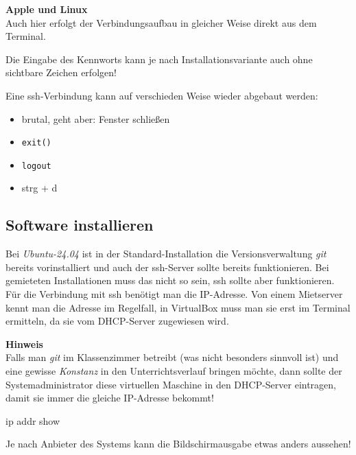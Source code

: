\documentclass[
  letterpaper,
  DIV=11]{scrreprt}
\newenvironment{Shaded}{\begin{snugshade}}{\end{snugshade}}
\newcommand{\ExtensionTok}[1]{\textcolor[rgb]{0.00,0.23,0.31}{#1}}
\newcommand{\NormalTok}[1]{\textcolor[rgb]{0.00,0.23,0.31}{#1}}
\newcommand{\git}{\textit{git}\xspace}
\newcommand{\strg}[1]{strg + #1\xspace}
\begin{document}
\textbf{Apple und Linux}\\
Auch hier erfolgt der Verbindungsaufbau in gleicher Weise direkt aus dem
Terminal.

Die Eingabe des Kennworts kann je nach Installationsvariante auch ohne
sichtbare Zeichen erfolgen!

Eine ssh-Verbindung kann auf verschieden Weise wieder abgebaut werden:

\begin{itemize}
\item
  brutal, geht aber: Fenster schließen
\item
  \texttt{exit()}
\item
  \texttt{logout}
\item
  \strg{d}
\end{itemize}

\subsection{Software installieren}\label{software-installieren}

Bei \emph{Ubuntu-24.04} ist in der Standard-Installation die
Versionsverwaltung \git bereits vorinstalliert und auch der ssh-Server
sollte bereits funktionieren. Bei gemieteten Installationen muss das
nicht so sein, ssh sollte aber funktionieren. Für die Verbindung mit ssh
benötigt man die IP-Adresse. Von einem Mietserver kennt man die Adresse
im Regelfall, in VirtualBox muss man sie erst im Terminal ermitteln, da
sie vom DHCP-Server zugewiesen wird.

\samplestart

\textbf{Hinweis}\\
Falls man \git im Klassenzimmer betreibt (was nicht besonders sinnvoll
ist) und eine gewisse \emph{Konstanz} in den Unterrichtsverlauf bringen
möchte, dann sollte der Systemadministrator diese virtuellen Maschine in
den DHCP-Server eintragen, damit sie immer die gleiche IP-Adresse
bekommt! \sampleend

\begin{Shaded}
\begin{Highlighting}[]
\ExtensionTok{ip}\NormalTok{ addr show}
\end{Highlighting}
\end{Shaded}

Je nach Anbieter des Systems kann die Bildschirmausgabe etwas anders
aussehen!
\end{document}
